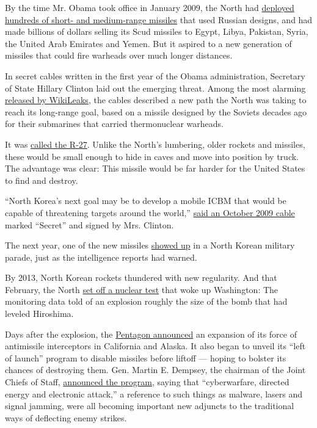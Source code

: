 By the time Mr. Obama took office in January 2009, the North had
\href{https://www.nonproliferation.org/wp-content/uploads/npr/npr_18-2_pollack_ballistic-trajectory.pdf}{deployed
hundreds of short- and medium-range missiles} that used Russian designs,
and had made billions of dollars selling its Scud missiles to Egypt,
Libya, Pakistan, Syria, the United Arab Emirates and Yemen. But it
aspired to a new generation of missiles that could fire warheads over
much longer distances.

In secret cables written in the first year of the Obama administration,
Secretary of State Hillary Clinton laid out the emerging threat. Among
the most alarming
\href{http://www.nytimes3xbfgragh.onion/interactive/world/statessecrets.html}{released
by WikiLeaks}, the cables described a new path the North was taking to
reach its long-range goal, based on a missile designed by the Soviets
decades ago for their submarines that carried thermonuclear warheads.

It was \href{http://www.navweaps.com/Weapons/WMRUS_R-27.php}{called the
R-27}. Unlike the North's lumbering, older rockets and missiles, these
would be small enough to hide in caves and move into position by truck.
The advantage was clear: This missile would be far harder for the United
States to find and destroy.

``North Korea's next goal may be to develop a mobile ICBM that would be
capable of threatening targets around the world,''
\href{https://wikileaks.org/plusd/cables/08STATE105029_a.html}{said an
October 2009 cable} marked ``Secret'' and signed by Mrs. Clinton.

The next year, one of the new missiles
\href{https://en.wikipedia.org/wiki/Hwasong-10}{showed up} in a North
Korean military parade, just as the intelligence reports had warned.

By 2013, North Korean rockets thundered with new regularity. And that
February, the North
\href{http://www.nytimes3xbfgragh.onion/2013/02/12/world/asia/north-korea-nuclear-test.html?ref=global-home}{set
off a nuclear test} that woke up Washington: The monitoring data told of
an explosion roughly the size of the bomb that had leveled Hiroshima.

Days after the explosion, the
\href{http://archive.defense.gov/Speeches/Speech.aspx?SpeechID=1759}{Pentagon
announced} an expansion of its force of antimissile interceptors in
California and Alaska. It also began to unveil its ``left of launch''
program to disable missiles before liftoff --- hoping to bolster its
chances of destroying them. Gen. Martin E. Dempsey, the chairman of the
Joint Chiefs of Staff,
\href{http://www.jcs.mil/Portals/36/Documents/Publications/JointIAMDVision2020.pdf}{announced
the program}, saying that ``cyberwarfare, directed energy and electronic
attack,'' a reference to such things as malware, lasers and signal
jamming, were all becoming important new adjuncts to the traditional
ways of deflecting enemy strikes.

